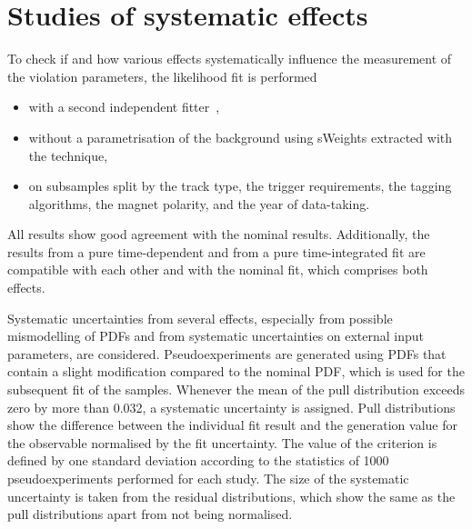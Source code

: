 
\section{Studies of systematic effects}
\label{sec:bd2jpsiks:systematics}

To check if and how various effects systematically influence the measurement
of the \CP violation parameters, the likelihood fit is performed
\begin{itemize}
    \item with a second independent fitter~\cite{Cauet-PhDThesis},
    \item without a parametrisation of the background using sWeights extracted
    with the \SPlot technique,
    \item  on subsamples split by the \KS track type, the trigger
    requirements, the tagging algorithms, the magnet polarity, and the year of
    data-taking.
\end{itemize}
All results show good agreement with the nominal results. Additionally, the
results from a pure time-dependent and from a pure time-integrated fit are
compatible with each other and with the nominal fit, which comprises both
effects.

Systematic uncertainties from several effects, especially from possible
mismodelling of PDFs and from systematic uncertainties on external input
parameters, are considered. Pseudoexperiments are generated using PDFs that
contain a slight modification compared to the nominal PDF, which is used for
the subsequent fit of the samples. Whenever the mean of the pull distribution
exceeds zero by more than \num{0.032}, a systematic uncertainty is assigned.
Pull distributions show the difference between the individual fit result and
the generation value for the \CP observable normalised by the fit uncertainty.
The value of the criterion is defined by one standard deviation according to
the statistics of \num{1000} pseudoexperiments performed for each study. The
size of the systematic uncertainty is taken from the residual distributions,
which show the same as the pull distributions apart from not being normalised.

